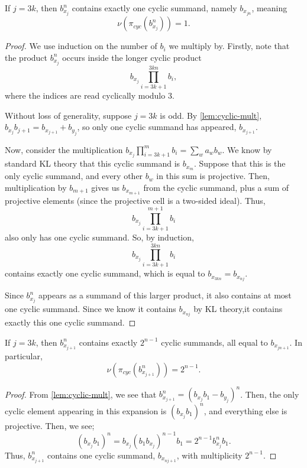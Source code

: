 \documentclass[a4paper,11pt]{amsart}
\numberwithin{equation}{subsection}
\theoremstyle{definition}
\theoremstyle{remark}
\begin{document}
\begin{Lemma}\label{lem:cyc0}
If $j=3k$, then $b_{x_j}^n$ contains exactly one cyclic summand, namely $b_{x_{jn}}$, meaning
\[
\nu(\pi_{cyc}(b_{x_j}^n))=1.
\]
\end{Lemma}

\begin{proof}
We use induction on the number of $b_i$ we multiply by. Firstly, note that the product $b_{x_j}^n$ occurs inside the longer cyclic product
\[
b_{x_j}\prod_{i=3k+1}^{3kn} b_i,
\]
where the indices are read cyclically modulo $3$. 

Without loss of generality, suppose $j=3k$ is odd. By \autoref{lem:cyclic-mult}, $b_{x_j}b_{j+1} = b_{x_{j+1}} + b_{y_j}$, so only one cyclic summand has appeared, $b_{x_{j+1}}$.

Now, consider the multiplication $b_{x_j} \prod_{i=3k+1}^{m} b_i = \sum_w a_w b_w$. We know by standard KL theory that this cyclic summand is $b_{x_m}$. Suppose that this is the only cyclic summand, and every other $b_w$ in this sum is projective. Then, multiplication by $b_{m+1}$ gives us $b_{x_{m+1}}$ from the cyclic summand, plus a sum of projective elements (since the projective cell is a two-sided ideal). Thus, 
\[b_{x_j} \prod_{i=3k+1}^{m+1} b_i\]
also only has one cyclic summand. So, by induction, 
\[b_{x_j}\prod_{i=3k+1}^{3kn}b_i\]
contains exactly one cyclic summand, which is equal to $b_{x_{3kn}} = b_{x_{nj}}$.

Since $b_{x_j}^n$ appears as a summand of this larger product, it also contains at most one cyclic summand. Since we know it contains $b_{x_{nj}}$ by KL theory,it contains exactly this one cyclic summand. 
\end{proof}

\begin{Lemma}\label{lem:cyc1}
If $j=3k$, then $b_{x_{j+1}}^n$ contains exactly $2^{n-1}$ cyclic summands, all equal to $b_{x_{jn+1}}$. In particular,
\[
\nu(\pi_{cyc}(b_{x_{j+1}}^n))=2^{n-1}.
\]
\end{Lemma}

\begin{proof}
From \autoref{lem:cyclic-mult}, we see that $b_{x_{j+1}}^n = (b_{x_j}b_1 - b_{y_j})^n$. Then, the only cyclic element appearing in this expansion is $(b_{x_j}b_1)^n$, and everything else is projective. Then, we see;
\[
(b_{x_j}b_1)^n
= b_{x_j}(b_1b_{x_j})^{n-1}b_1
=2^{n-1}b_{x_j}^n b_1.
\]
Thus, $b_{x_{j+1}}^n$ contains one cyclic summand, $b_{x_{nj+1}}$, with multiplicity $2^{n-1}$.
\end{proof}
\end{document}
